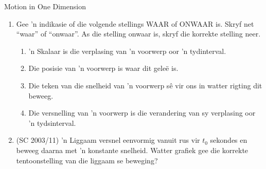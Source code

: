 \begin{eocexercises}{Motion in One Dimension}
\begin{enumerate}[noitemsep, label=\textbf{\arabic*}. ]
    \item Gee 'n indikasie of die volgende stellings WAAR of ONWAAR is. Skryf net ``waar'' of ``onwaar''. As die stelling onwaar is, skryf die korrekte stelling neer.
    \begin{enumerate}[noitemsep, label=\textbf{\alph*}. ] 
        \item 'n Skalaar is die verplasing van 'n voorwerp oor 'n tydinterval.
        \item Die posisie van 'n voorwerp is waar dit gele\"e is.
        \item Die teken van die snelheid van 'n voorwerp s\^e vir ons in watter rigting dit beweeg.
        \item Die versnelling van 'n voorwerp is die verandering van sy verplasing oor 'n tydsinterval.
    \end{enumerate}
    
    \item (SC 2003/11) 'n Liggaam versnel eenvormig vanuit rus vir $t_0$ sekondes en beweeg daarna met 'n konstante snelheid. Watter grafiek gee die korrekte tentoonstelling van die liggaam se beweging?


\end{enumerate}
\end{eocexercises}
